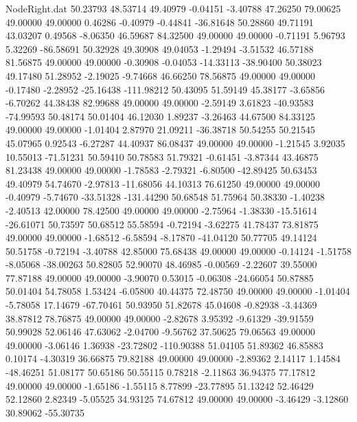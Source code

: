 \begin{filecontents}{NodeRight.dat}
  50.23793   48.53714   49.40979    -0.04151   -3.40788   47.26250   79.00625   49.00000   49.00000    0.46286   -0.40979   -0.44841  -36.81648
  50.28860   49.71191   43.03207     0.49568   -8.06350   46.59687   84.32500   49.00000   49.00000   -0.71191    5.96793    5.32269  -86.58691
  50.32928   49.30908   49.04053    -1.29494   -3.51532   46.57188   81.56875   49.00000   49.00000   -0.30908   -0.04053  -14.33113  -38.90400
  50.38023   49.17480   51.28952    -2.19025   -9.74668   46.66250   78.56875   49.00000   49.00000   -0.17480   -2.28952  -25.16438 -111.98212
  50.43095   51.59149   45.38177    -3.65856   -6.70262   44.38438   82.99688   49.00000   49.00000   -2.59149    3.61823  -40.93583  -74.99593
  50.48174   50.01404   46.12030     1.89237   -3.26463   44.67500   84.33125   49.00000   49.00000   -1.01404    2.87970   21.09211  -36.38718
  50.54255   50.21545   45.07965     0.92543   -6.27287   44.40937   86.08437   49.00000   49.00000   -1.21545    3.92035   10.55013  -71.51231
  50.59410   50.78583   51.79321    -0.61451   -3.87344   43.46875   81.23438   49.00000   49.00000   -1.78583   -2.79321   -6.80500  -42.89425
  50.63453   49.40979   54.74670    -2.97813  -11.68056   44.10313   76.61250   49.00000   49.00000   -0.40979   -5.74670  -33.51328 -131.44290
  50.68548   51.75964   50.38330    -1.40238   -2.40513   42.00000   78.42500   49.00000   49.00000   -2.75964   -1.38330  -15.51614  -26.61071
  50.73597   50.68512   55.58594    -0.72194   -3.62275   41.78437   73.81875   49.00000   49.00000   -1.68512   -6.58594   -8.17870  -41.04120
  50.77705   49.14124   50.51758    -0.72194   -3.40788   42.85000   75.68438   49.00000   49.00000   -0.14124   -1.51758   -8.05068  -38.00263
  50.82805   52.90070   48.46985    -0.00569   -2.22607   39.55000   77.87188   49.00000   49.00000   -3.90070    0.53015   -0.06308  -24.66054
  50.87885   50.01404   54.78058     1.53424   -6.05800   40.44375   72.48750   49.00000   49.00000   -1.01404   -5.78058   17.14679  -67.70461
  50.93950   51.82678   45.04608    -0.82938   -3.44369   38.87812   78.76875   49.00000   49.00000   -2.82678    3.95392   -9.61329  -39.91559
  50.99028   52.06146   47.63062    -2.04700   -9.56762   37.50625   79.06563   49.00000   49.00000   -3.06146    1.36938  -23.72802 -110.90388
  51.04105   51.89362   46.85883     0.10174   -4.30319   36.66875   79.82188   49.00000   49.00000   -2.89362    2.14117    1.14584  -48.46251
  51.08177   50.65186   50.55115     0.78218   -2.11863   36.94375   77.17812   49.00000   49.00000   -1.65186   -1.55115    8.77899  -23.77895
  51.13242   52.46429   52.12860     2.82349   -5.05525   34.93125   74.67812   49.00000   49.00000   -3.46429   -3.12860   30.89062  -55.30735

\end{filecontents}
